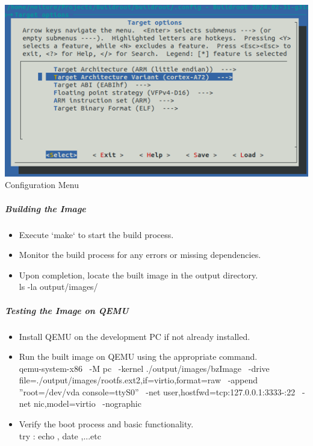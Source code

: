         \includegraphics[width=1\linewidth]{Images/9_Linux_image/Buildroot Configuration Menu.png}
       \centering
        Configuration Menu
        \label{fig:enter-label}
        \\
    \raggedright
\subparagraph{Building the Image}
\begin{itemize}
    \item Execute `make` to start the build process.
    \item Monitor the build process for any errors or missing dependencies.
    \item Upon completion, locate the built image in the output directory.\\
    ls -la output/images/
    
\end{itemize}

\subparagraph{Testing the Image on QEMU}
\begin{itemize}
    \item Install QEMU on the development PC if not already installed.
    \item Run the built image on QEMU using the appropriate command. \\
    qemu-system-x86 \
    -M pc \
    -kernel ./output/images/bzImage \
    -drive file=./output/images/rootfs.ext2,if=virtio,format=raw \
    -append ''root=/dev/vda console=ttyS0'' \
    -net user,hostfwd=tcp:127.0.0.1:3333-:22 \
    -net nic,model=virtio \
    -nographic

    \item Verify the boot process and basic functionality.\\
    try : echo , date ,...etc
\end{itemize}

